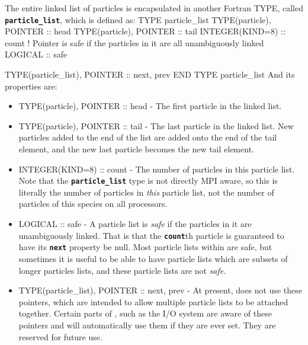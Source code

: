 \documentclass[12pt,a4paper]{article}
\newcommand{\inlinecode}[1]{{\color{warwickred} \bf\texttt{#1}}}
\newcommand{\EPOCH}{{\color{warwickdark}\fontfamily{phv}\selectfont{EPOCH}}}
\newenvironment{boxverbatim}{\lboxverbatim{none}}{\endlboxverbatim}
\begin{document}
The entire linked list of particles is encapsulated in another Fortran TYPE,
called \inlinecode{particle\_list}, which is defined as:
\begin{boxverbatim}
TYPE particle_list
  TYPE(particle), POINTER :: head
  TYPE(particle), POINTER :: tail
  INTEGER(KIND=8) :: count
  ! Pointer is safe if the particles in it are all unambiguously linked
  LOGICAL :: safe

  TYPE(particle_list), POINTER :: next, prev
END TYPE particle_list
\end{boxverbatim}
And its properties are:
\begin{itemize}
\item TYPE(particle), POINTER :: head - The first particle in the linked list.
\item TYPE(particle), POINTER :: tail - The last particle in the linked
  list. New particles added to the end of the list are added onto the end of
  the tail element, and the new last particle becomes the new tail element.
\item INTEGER(KIND=8) :: count - The number of particles in this particle
  list. Note that the \inlinecode{particle\_list} type is not directly MPI
  aware, so this is literally the number of particles in {\it this} particle
  list, not the number of particles of this species on all processors.
\item LOGICAL :: safe - A particle list is {\it safe} if the particles in it
  are unambiguously linked. That is that the \inlinecode{count}th particle is
  guaranteed to have its \inlinecode{next} property be null. Most particle
  lists within {\EPOCH} are safe, but sometimes it is useful to be able to have
  particle lists which are subsets of longer particles lists, and these
  particle lists are not {\it safe}.
\item TYPE(particle\_list), POINTER :: next, prev - At present, {\EPOCH} does
  not use these pointers, which are intended to allow multiple particle lists to
  be attached together. Certain parts of {\EPOCH}, such as the I/O system are
  aware of these pointers and will automatically use them if they are ever
  set. They are reserved for future use.
\end{itemize}
\end{document}
